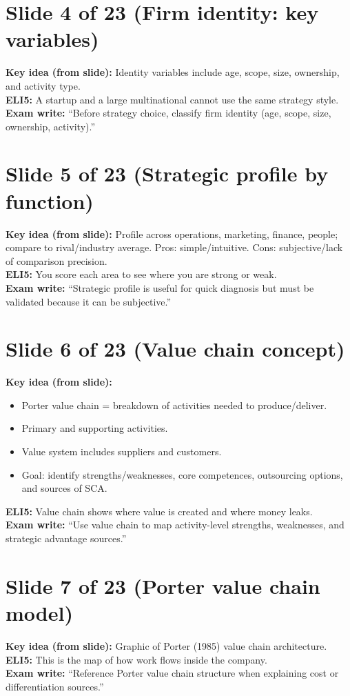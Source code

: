 \documentclass[11pt,a4paper]{article}
\begin{document}
\section*{Slide 4 of 23 (Firm identity: key variables)}
\textbf{Key idea (from slide):} Identity variables include age, scope, size, ownership, and activity type.\\
\textbf{ELI5:} A startup and a large multinational cannot use the same strategy style.\\
\textbf{Exam write:} ``Before strategy choice, classify firm identity (age, scope, size, ownership, activity).''

\section*{Slide 5 of 23 (Strategic profile by function)}
\textbf{Key idea (from slide):} Profile across operations, marketing, finance, people; compare to rival/industry average. Pros: simple/intuitive. Cons: subjective/lack of comparison precision.\\
\textbf{ELI5:} You score each area to see where you are strong or weak.\\
\textbf{Exam write:} ``Strategic profile is useful for quick diagnosis but must be validated because it can be subjective.''

\section*{Slide 6 of 23 (Value chain concept)}
\textbf{Key idea (from slide):}
\begin{itemize}
  \item Porter value chain = breakdown of activities needed to produce/deliver.
  \item Primary and supporting activities.
  \item Value system includes suppliers and customers.
  \item Goal: identify strengths/weaknesses, core competences, outsourcing options, and sources of SCA.
\end{itemize}
\textbf{ELI5:} Value chain shows where value is created and where money leaks.\\
\textbf{Exam write:} ``Use value chain to map activity-level strengths, weaknesses, and strategic advantage sources.''

\section*{Slide 7 of 23 (Porter value chain model)}
\textbf{Key idea (from slide):} Graphic of Porter (1985) value chain architecture.\\
\textbf{ELI5:} This is the map of how work flows inside the company.\\
\textbf{Exam write:} ``Reference Porter value chain structure when explaining cost or differentiation sources.''
\end{document}
